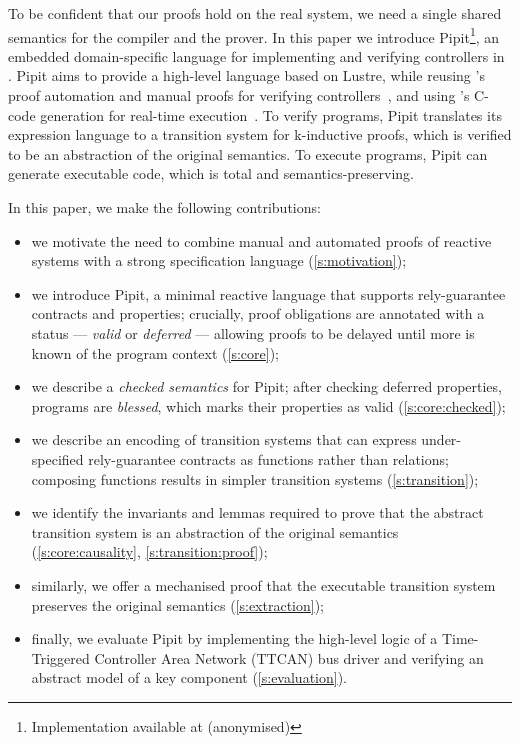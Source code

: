 \documentclass[a4paper,UKenglish,cleveref, autoref, thm-restate,anonymous]{lipics-v2021}
\newcommand{\GITHUBURL}{(anonymised)}
\newcommand{\GITHUBURL}{\url{https://github.com/songlarknet/pipit}}
\begin{document}
To be confident that our proofs hold on the real system, we need a single shared semantics for the compiler and the prover.
In this paper we introduce Pipit\footnote{Implementation available at \GITHUBURL}, an embedded domain-specific language for implementing and verifying controllers in \fstar{}.
Pipit aims to provide a high-level language based on Lustre, while reusing \fstar{}'s proof automation and manual proofs for verifying controllers~\cite{martinez2019meta}, and using \lowstar{}'s C-code generation for real-time execution~\cite{protzenko2017verified}.
To verify programs, Pipit translates its expression language to a transition system for k-inductive proofs, which is verified to be an abstraction of the original semantics.
To execute programs, Pipit can generate executable code, which is total and semantics-preserving.



In this paper, we make the following contributions:

\begin{itemize}
  \item we motivate the need to combine manual and automated proofs of reactive systems with a strong specification language (\autoref{s:motivation});
  \item we introduce Pipit, a minimal reactive language that supports rely-guarantee contracts and properties; crucially, proof obligations are annotated with a status --- \emph{valid} or \emph{deferred} --- allowing proofs to be delayed until more is known of the program context (\autoref{s:core});
  \item we describe a \emph{checked semantics} for Pipit; after checking deferred properties, programs are \emph{blessed}, which marks their properties as valid (\autoref{s:core:checked});
  \item we describe an encoding of transition systems that can express under-specified rely-guarantee contracts as functions rather than relations; composing functions results in simpler transition systems (\autoref{s:transition});
  \item we identify the invariants and lemmas required to prove that the abstract transition system is an abstraction of the original semantics (\autoref{s:core:causality}, \autoref{s:transition:proof});
  \item similarly, we offer a mechanised proof that the executable transition system preserves the original semantics (\autoref{s:extraction});
  \item finally, we evaluate Pipit by implementing the high-level logic of a Time-Triggered Controller Area Network (TTCAN) bus driver and verifying an abstract model of a key component (\autoref{s:evaluation}).
\end{itemize}
 
\end{document}
